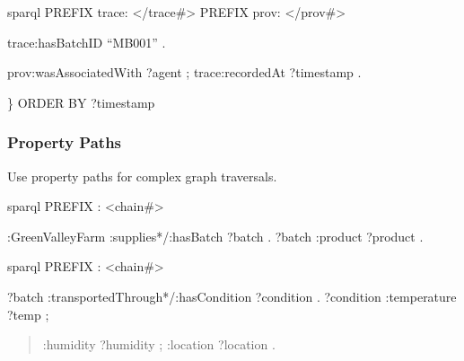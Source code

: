\documentclass[letterpaper,10pt,english]{sphinxmanual}
\begin{document}
\sphinxAtStartPar
{}
{\color{red}\bfseries{}\textasciigrave{}\textasciigrave{}}{\color{red}\bfseries{}\textasciigrave{}}sparql
PREFIX trace: \textless{}/trace\#\textgreater{}
PREFIX prov: \textless{}/prov\#\textgreater{}
\begin{description}
\begin{description}
\sphinxAtStartPar
trace:hasBatchID “MB001” .

\sphinxAtStartPar
prov:wasAssociatedWith ?agent ;
trace:recordedAt ?timestamp .

\end{description}

\end{description}

\sphinxAtStartPar
\}
ORDER BY ?timestamp
{\color{red}\bfseries{}\textasciigrave{}\textasciigrave{}}{\color{red}\bfseries{}\textasciigrave{}}


\subsubsection{Property Paths}
\label{\detokenize{api/sparql-api:property-paths}}
\sphinxAtStartPar
Use property paths for complex graph traversals.

\sphinxAtStartPar
{}
{\color{red}\bfseries{}\textasciigrave{}\textasciigrave{}}{\color{red}\bfseries{}\textasciigrave{}}sparql
PREFIX : \textless{}\sphinxhyphen{}chain\#\textgreater{}
\begin{description}
\sphinxAtStartPar
:GreenValleyFarm :supplies*/:hasBatch ?batch .
?batch :product ?product .

\end{description}

\sphinxAtStartPar
{}
{\color{red}\bfseries{}\textasciigrave{}\textasciigrave{}}{\color{red}\bfseries{}\textasciigrave{}}sparql
PREFIX : \textless{}\sphinxhyphen{}chain\#\textgreater{}
\begin{description}
\sphinxAtStartPar
?batch :transportedThrough*/:hasCondition ?condition .
?condition :temperature ?temp ;
\begin{quote}

\sphinxAtStartPar
:humidity ?humidity ;
:location ?location .
\end{quote}

\end{description}
\end{document}
